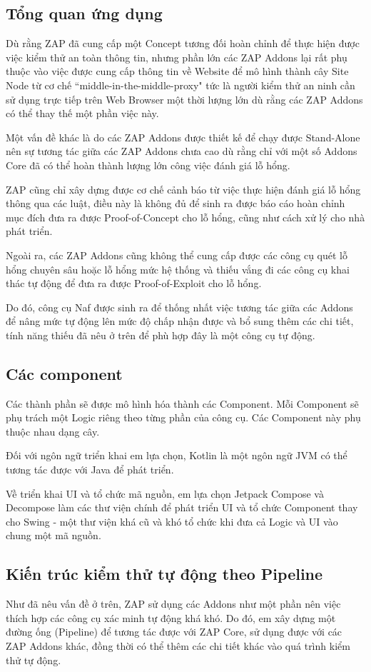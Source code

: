 \documentclass[./../main.tex]{subfiles}
\begin{document}
\subsection{Tổng quan ứng dụng}

Dù rằng ZAP đã cung cấp một Concept tương đối hoàn chỉnh để thực hiện được việc kiểm thử an toàn thông tin, nhưng phần lớn các ZAP Addons lại rất  phụ thuộc vào việc được cung cấp thông tin về Website để mô hình thành cây Site Node từ cơ chế “middle-in-the-middle-proxy" tức là người kiểm thử an ninh cần sử dụng trực tiếp trên Web Browser một thời lượng lớn dù rằng các ZAP Addons có thể thay thế một phần việc này.

Một vấn đề khác là do các ZAP Addons được thiết kế để chạy được Stand-Alone nên sự tương tác giữa các ZAP Addons chưa cao dù rằng chỉ với một số Addons Core đã có thể hoàn thành lượng lớn công việc đánh giá lỗ hổng.

ZAP cũng chỉ xây dựng được cơ chế cảnh báo từ việc thực hiện đánh giá lỗ hổng thông qua các luật, điều này là không đủ để sinh ra được báo cáo hoàn chỉnh mục đích đưa ra được Proof-of-Concept cho lỗ hổng, cũng như cách xử lý cho nhà phát triển.

Ngoài ra, các ZAP Addons cũng không thể cung cấp được các công cụ quét lỗ hổng chuyên sâu hoặc lỗ hổng mức hệ thống và thiếu vắng đi các công cụ khai thác tự động để đưa ra được Proof-of-Exploit cho lỗ hổng.

Do đó, công cụ Naf được sinh ra để thống nhất việc tương tác giữa các Addons để nâng mức tự động lên mức độ chấp nhận được và bổ sung thêm các chi tiết, tính năng thiếu đã nêu ở trên để phù hợp đây là một công cụ tự động.

\subsection{Các component}
Các thành phần sẽ được mô hình hóa thành các Component. Mỗi Component sẽ phụ trách một Logic riêng theo từng phần của công cụ. Các Component này phụ thuộc nhau dạng cây.


Đối với ngôn ngữ triển khai em lựa chọn, Kotlin là một ngôn ngữ JVM có thể tương tác được với Java để phát triển.

Về triển khai UI và tổ chức mã nguồn, em lựa chọn Jetpack Compose và Decompose làm các thư viện chính để phát triển UI và tổ chức Component thay cho Swing - một thư viện khá cũ và khó tổ chức khi đưa cả Logic và UI vào chung một mã nguồn.

\subsection{Kiến trúc kiểm thử tự động theo Pipeline}
Như đã nêu vấn đề ở trên, ZAP sử dụng các Addons như một phần nên việc thích hợp các công cụ xác minh tự động khá khó. Do đó, em xây dựng một đường ống (Pipeline) để tương tác được với ZAP Core, sử dụng được với các ZAP Addons khác, đồng thời có thể thêm các chi tiết khác vào quá trình kiểm thử tự động.
\end{document}
